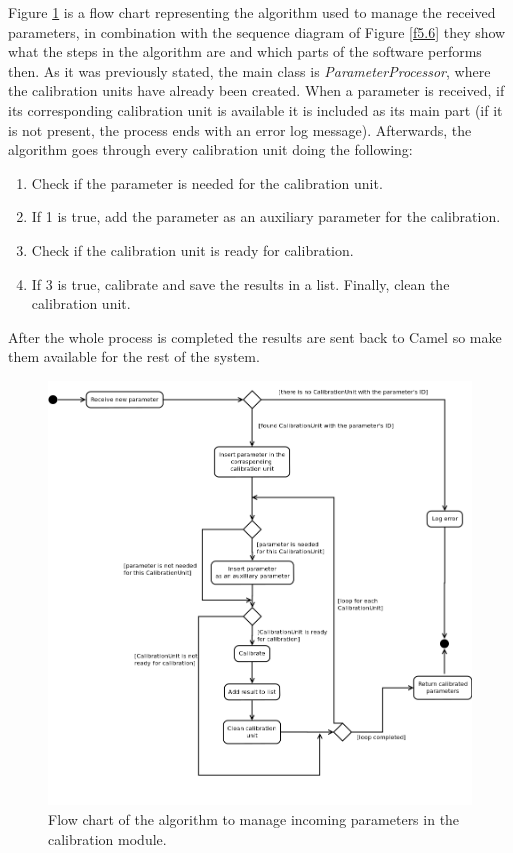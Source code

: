 Figure \ref{f5.5} is a flow chart representing the algorithm used to manage the received parameters, in combination with the sequence diagram of Figure \ref{f5.6} they show what the steps in the algorithm are and which parts of the software performs then. As it was previously stated, the main class is \emph{ParameterProcessor}, where the calibration units have already been created. When a parameter is received, if its corresponding calibration unit is available it is included as its main part (if it is not present, the process ends with an error log message). Afterwards, the algorithm goes through every calibration unit doing the following:
\begin{enumerate}
\item Check if the parameter is needed for the calibration unit.
\item If 1 is true, add the parameter as an auxiliary parameter for the calibration.
\item Check if the calibration unit is ready for calibration.
\item If 3 is true, calibrate and save the results in a list. Finally, clean the calibration unit.
\end{enumerate}

After the whole process is completed the results are sent back to Camel so make them available for the rest of the system.

\begin{figure}[H]
\centerline{\includegraphics[width=1\textwidth]{images/ReceiveParameterAndCalibrateFlowChart.png}}
\caption{Flow chart of the algorithm to manage incoming parameters in the calibration module.}
\label{f5.5}
\end{figure}


